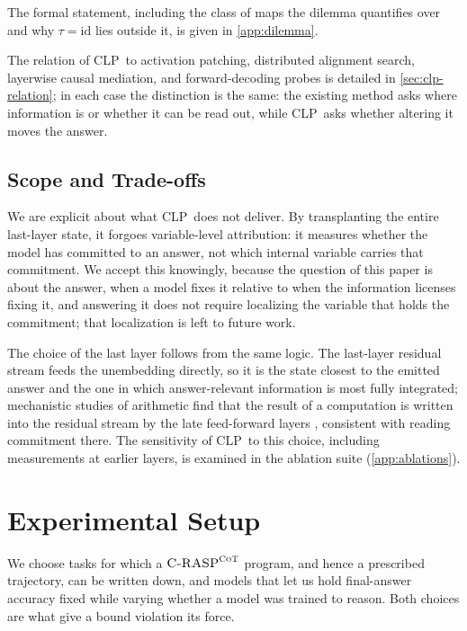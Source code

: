 \documentclass[11pt]{article}
\newcommand{\CLP}{\textsc{CLP}}
\newcommand{\CRASPCoT}{\textsc{C-RASP}^{\textsc{CoT}}}
\begin{document}
\noindent The formal statement, including the class of maps the dilemma quantifies
over and why $\tau=\mathrm{id}$ lies outside it, is given in \cref{app:dilemma}.

The relation of \CLP\ to activation patching, distributed alignment search,
layerwise causal mediation, and forward-decoding probes is detailed in
\cref{sec:clp-relation}; in each case the distinction is the same: the existing
method asks where information is or whether it can be read out, while \CLP\ asks
whether altering it moves the answer.

\subsection{Scope and Trade-offs}
\label{sec:clp-scope}

We are explicit about what \CLP\ does not deliver. By transplanting the entire
last-layer state, it forgoes variable-level attribution: it measures whether the
model has committed to an answer, not which internal variable carries that
commitment. We accept this knowingly, because the question of this paper is
about the answer, when a model fixes it relative to when the information
licenses fixing it, and answering it does not require localizing the variable
that holds the commitment; that localization is left to future work.

The choice of the last layer follows from the same logic. The last-layer
residual stream feeds the unembedding directly, so it is the state closest to
the emitted answer and the one in which answer-relevant information is most fully
integrated; mechanistic studies of arithmetic find that the result of a
computation is written into the residual stream by the late feed-forward layers
\citep{DBLP:conf/emnlp/StolfoBS23}, consistent with reading commitment there. The
sensitivity of \CLP\ to this choice, including measurements at earlier layers, is
examined in the ablation suite (\cref{app:ablations}).

\section{Experimental Setup}
\label{sec:setup}

We choose tasks for which a $\CRASPCoT$ program, and hence a prescribed
trajectory, can be written down, and models that let us hold final-answer
accuracy fixed while varying whether a model was trained to reason. Both
choices are what give a bound violation its force.
\end{document}
